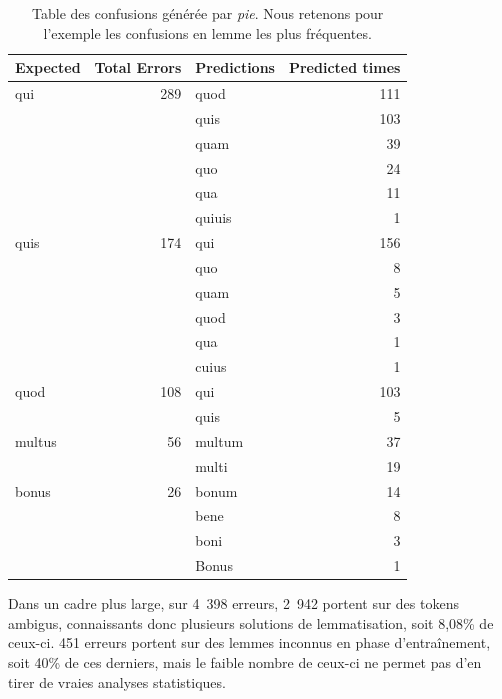 \begin{table}[]
\begin{tabular}{lrlr}
\toprule
Expected & Total Errors & Predictions & Predicted times \\ \midrule
qui      & 289          & quod        & 111             \\
         &              & quis        & 103             \\
         &              & quam        & 39              \\
         &              & quo         & 24              \\
         &              & qua         & 11              \\
         &              & quiuis      & 1               \\
quis     & 174          & qui         & 156             \\
         &              & quo         & 8               \\
         &              & quam        & 5               \\
         &              & quod        & 3               \\
         &              & qua         & 1               \\
         &              & cuius       & 1               \\
quod     & 108          & qui         & 103             \\
         &              & quis        & 5               \\
multus   & 56           & multum      & 37              \\
         &              & multi       & 19              \\
bonus    & 26           & bonum       & 14              \\
         &              & bene        & 8               \\
         &              & boni        & 3               \\
         &              & Bonus       & 1               \\ \bottomrule
\end{tabular}
\caption{Table des confusions générée par \textit{pie}. Nous retenons pour l'exemple les confusions en lemme les plus fréquentes.}
\label{lemma:confusion-table}
\end{table}

Dans un cadre plus large, sur 4~398 erreurs, 2~942 portent sur des tokens ambigus, connaissants donc plusieurs solutions de lemmatisation, soit 8,08\% de ceux-ci. 451 erreurs portent sur des lemmes inconnus en phase d'entraînement, soit 40\% de ces derniers, mais le faible nombre de ceux-ci ne permet pas d'en tirer de vraies analyses statistiques.


